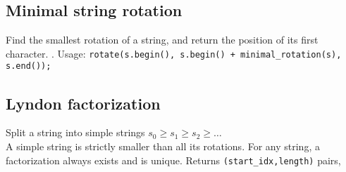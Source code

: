 \subsection{Minimal string rotation}
Find the smallest rotation of a string, and return the position of its first character. . Usage:
\texttt{rotate(s.begin(), s.begin() + minimal\_rotation(s), s.end());}


\subsection{Lyndon factorization}
Split a string into simple strings $s_0 \geq s_1 \geq s_2 \geq \ldots $\\
A simple string is strictly smaller than all its rotations. For any string, a factorization always exists and is unique. Returns \texttt{(start\_idx,length)} pairs, 


